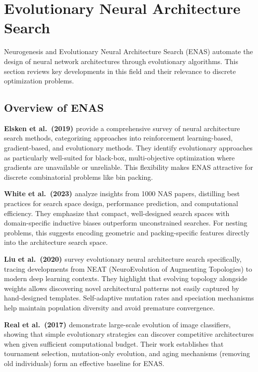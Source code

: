 \section{Evolutionary Neural Architecture Search}
\label{sec:enas}

Neurogenesis and Evolutionary Neural Architecture Search (ENAS) automate the design of neural network architectures through evolutionary algorithms. This section reviews key developments in this field and their relevance to discrete optimization problems.

\subsection{Overview of ENAS}

\textbf{Elsken et al.\ (2019) \cite{EMH19}} provide a comprehensive survey of neural architecture search methods, categorizing approaches into reinforcement learning-based, gradient-based, and evolutionary methods. They identify evolutionary approaches as particularly well-suited for black-box, multi-objective optimization where gradients are unavailable or unreliable. This flexibility makes ENAS attractive for discrete combinatorial problems like bin packing.

\textbf{White et al.\ (2023) \cite{WSS+23}} analyze insights from 1000 NAS papers, distilling best practices for search space design, performance prediction, and computational efficiency. They emphasize that compact, well-designed search spaces with domain-specific inductive biases outperform unconstrained searches. For nesting problems, this suggests encoding geometric and packing-specific features directly into the architecture search space.

\textbf{Liu et al.\ (2020) \cite{LSX+20}} survey evolutionary neural architecture search specifically, tracing developments from NEAT (NeuroEvolution of Augmenting Topologies) to modern deep learning contexts. They highlight that evolving topology alongside weights allows discovering novel architectural patterns not easily captured by hand-designed templates. Self-adaptive mutation rates and speciation mechanisms help maintain population diversity and avoid premature convergence.

\textbf{Real et al.\ (2017) \cite{RMS+17}} demonstrate large-scale evolution of image classifiers, showing that simple evolutionary strategies can discover competitive architectures when given sufficient computational budget. Their work establishes that tournament selection, mutation-only evolution, and aging mechanisms (removing old individuals) form an effective baseline for ENAS.

